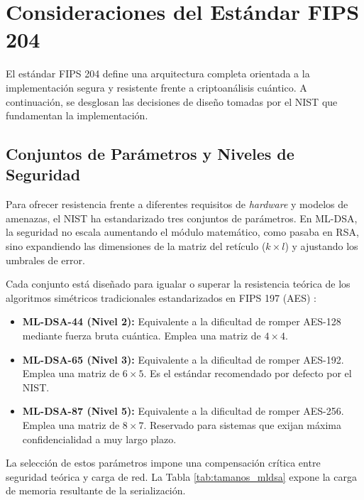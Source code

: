 \documentclass[11pt, a4paper]{report}
\theoremstyle{definition}
\begin{document}
\section{Consideraciones del Estándar FIPS 204}
\label{sec:fips204_analisis}

El estándar FIPS 204 \cite{nist_fips204} define una arquitectura completa orientada a la implementación segura y resistente frente a criptoanálisis cuántico. A continuación, se desglosan las decisiones de diseño tomadas por el NIST que fundamentan la implementación.

\subsection{Conjuntos de Parámetros y Niveles de Seguridad}
\label{subsec:parametros_niveles}

Para ofrecer resistencia frente a diferentes requisitos de \textit{hardware} y modelos de amenazas, el NIST ha estandarizado tres conjuntos de parámetros. En ML-DSA, la seguridad no escala aumentando el módulo matemático, como pasaba en RSA, sino expandiendo las dimensiones de la matriz del retículo ($k \times l$) y ajustando los umbrales de error.

Cada conjunto está diseñado para igualar o superar la resistencia teórica de los algoritmos simétricos tradicionales estandarizados en FIPS 197 (AES) \cite{nist_fips197}:

\begin{itemize}
    \item \textbf{ML-DSA-44 (Nivel 2):} Equivalente a la dificultad de romper AES-128 mediante fuerza bruta cuántica. Emplea una matriz de $4 \times 4$.
    \item \textbf{ML-DSA-65 (Nivel 3):} Equivalente a la dificultad de romper AES-192. Emplea una matriz de $6 \times 5$. Es el estándar recomendado por defecto por el NIST.
    \item \textbf{ML-DSA-87 (Nivel 5):} Equivalente a la dificultad de romper AES-256. Emplea una matriz de $8 \times 7$. Reservado para sistemas que exijan máxima confidencialidad a muy largo plazo.
\end{itemize}

La selección de estos parámetros impone una compensación crítica entre seguridad teórica y carga de red. La Tabla \ref{tab:tamanos_mldsa} expone la carga de memoria resultante de la serialización.
\end{document}
